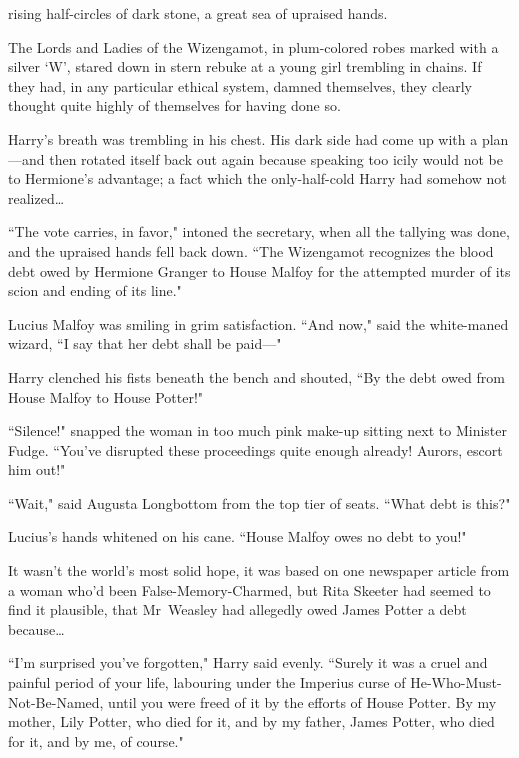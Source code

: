 
 rising half-circles of dark stone, a great sea of upraised hands.

\hplettrineextrapara
The Lords and Ladies of the Wizengamot, in plum-colored robes marked with a silver `W', stared down in stern rebuke at a young girl trembling in chains. If they had, in any particular ethical system, damned themselves, they clearly thought quite highly of themselves for having done so.

Harry's breath was trembling in his chest. His dark side had come up with a plan—and then rotated itself back out again because speaking too icily would not be to Hermione's advantage; a fact which the only-half-cold Harry had somehow not realized{\ldots}

``The vote carries, in favor," intoned the secretary, when all the tallying was done, and the upraised hands fell back down. ``The Wizengamot recognizes the blood debt owed by Hermione Granger to House Malfoy for the attempted murder of its scion and ending of its line."

Lucius Malfoy was smiling in grim satisfaction. ``And now," said the white-maned wizard, ``I say that her debt shall be paid—"

Harry clenched his fists beneath the bench and shouted, ``By the debt owed from House Malfoy to House Potter!"

``Silence!" snapped the woman in too much pink make-up sitting next to Minister Fudge. ``You've disrupted these proceedings quite enough already! Aurors, escort him out!"

``Wait," said Augusta Longbottom from the top tier of seats. ``What debt is this?"

Lucius's hands whitened on his cane. ``House Malfoy owes no debt to you!"

It wasn't the world's most solid hope, it was based on one newspaper article from a woman who'd been False-Memory-Charmed, but Rita Skeeter had seemed to find it plausible, that Mr~Weasley had allegedly owed James Potter a debt because{\ldots}

``I'm surprised you've forgotten," Harry said evenly. ``Surely it was a cruel and painful period of your life, labouring under the Imperius curse of He-Who-Must-Not-Be-Named, until you were freed of it by the efforts of House Potter. By my mother, Lily Potter, who died for it, and by my father, James Potter, who died for it, and by me, of course."

